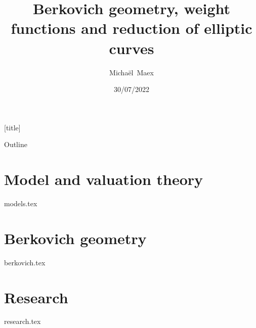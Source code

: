 \documentclass[12pt,english,aspectratio=169]{beamer}
\title{Berkovich geometry, weight functions and reduction of elliptic curves}
\author{\mbox{Michaël Maex}}
\date{30/07/2022}
\institute{Supervised by J.\ Nicaise}
\begin{document}
[title]

\begin{frame}
    \titlepage
\end{frame}

\usedefaultcanvas


\emptyfooter
\begin{frame}[noframenumbering]{Outline}
        \tableofcontents
    \end{frame}
\largefooter


\section{Model and valuation theory} \label{sec:model_and_valuation_theory}
{models.tex}

\begin{frame}
	\tableofcontents[ 
currentsection, 
hideothersubsections, 
sectionstyle=show/shaded, 
subsectionstyle=show/shaded, 
]
\end{frame}
\section{Berkovich geometry} \label{sec:berkovich_geometry}
{berkovich.tex}

\section{Research} \label{sec:research}
{research.tex}
\end{document}
